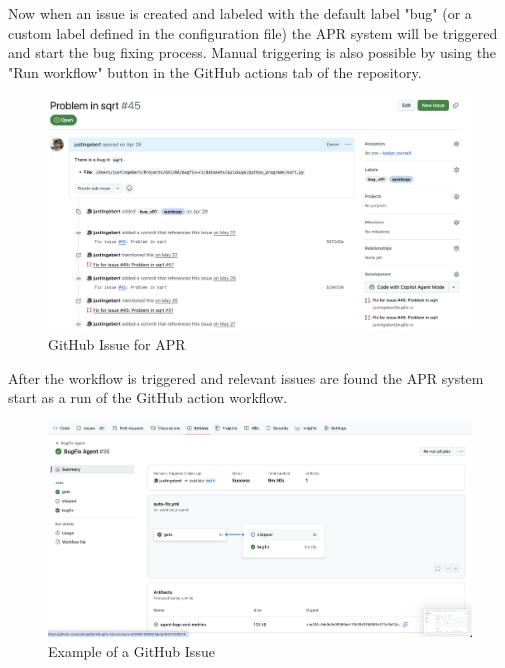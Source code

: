 Now when an issue is created and labeled with the default label "bug" (or a custom label defined in the configuration file) the APR system will be triggered and start the bug fixing process. Manual triggering is also possible by using the "Run workflow" button in the GitHub actions tab of the repository.
\begin{figure}[H]
    \centering
    \includegraphics[width=1\textwidth]{images/github/GitHub Issue.png}
    \caption{GitHub Issue for APR}
    \label{fig:gh-issue-APR}
\end{figure}

After the workflow is triggered and relevant issues are found the APR system start as a run of the GitHub action workflow.
\begin{figure}[H]
    \centering
    \includegraphics[width=1\textwidth]{images/workflow/Action.png}
    \caption{Example of a GitHub Issue}
    \label{fig:apr-action}
\end{figure}


